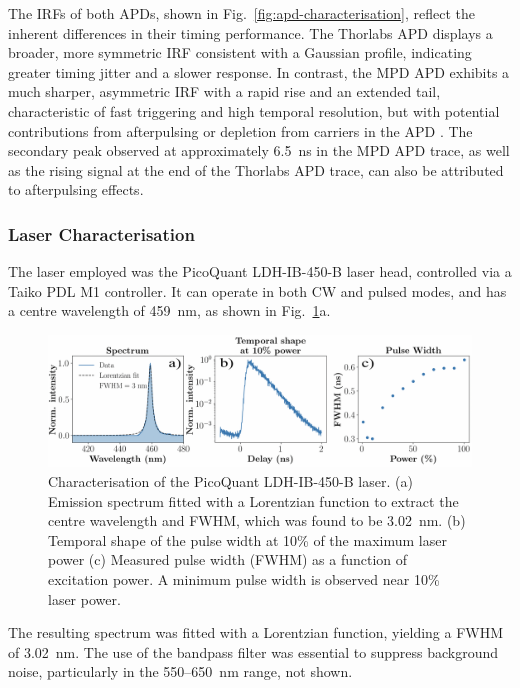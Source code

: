 The IRFs of both APDs, shown in Fig.~\ref{fig:apd-characterisation}, reflect the inherent differences in their timing performance. The Thorlabs APD displays a broader, more symmetric IRF consistent with a Gaussian profile, indicating greater timing jitter and a slower response. In contrast, the MPD APD exhibits a much sharper, asymmetric IRF with a rapid rise and an extended tail, characteristic of fast triggering and high temporal resolution, but with potential contributions from afterpulsing or depletion from carriers in the APD \cite{Ziarkash2018}. The secondary peak observed at approximately 6.5~ns in the MPD APD trace, as well as the rising signal at the end of the Thorlabs APD trace, can also be attributed to afterpulsing effects.


\subsubsection{Laser Characterisation}

The laser employed was the PicoQuant LDH-IB-450-B laser head, controlled via a Taiko PDL M1 controller. It can operate in both CW and pulsed modes, and has a centre wavelength of 459~nm, as shown in Fig.~\ref{fig:laser-char}a.

\begin{figure}[h]
    \centering
    \includegraphics[width=1\linewidth]{Figures/LaserCharacterisation.png}
    \caption{Characterisation of the PicoQuant LDH-IB-450-B laser. (a) Emission spectrum fitted with a Lorentzian function to extract the centre wavelength and FWHM, which was found to be 3.02~nm. (b) Temporal shape of the pulse width at 10\% of the maximum laser power (c) Measured pulse width (FWHM) as a function of excitation power. A minimum pulse width is observed near 10\% laser power.}
    \label{fig:laser-char}
\end{figure}

The resulting spectrum was fitted with a Lorentzian function, yielding a FWHM of 3.02~nm. The use of the bandpass filter was essential to suppress background noise, particularly in the 550--650~nm range, not shown.

